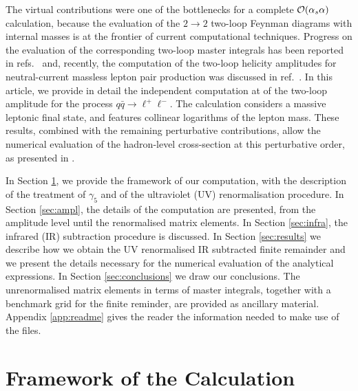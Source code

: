 \documentclass[11pt,a4paper]{article}
\begin{document}
The virtual contributions were one of the bottlenecks for a complete ${\cal O}(\alpha_{s}\alpha)$ calculation, because
the evaluation of the $2\to 2$ two-loop Feynman diagrams with internal masses is at the frontier of current computational techniques.
Progress on the evaluation of the corresponding two-loop master integrals has been reported in refs.~\cite{Bonciani:2016ypc,Heller:2019gkq,Hasan:2020vwn,Long:2021fdc}
and, recently,
the computation of the two-loop helicity amplitudes for neutral-current massless lepton pair production was discussed in ref.~\cite{Heller:2020owb}.
%
In this article, we provide in detail the independent computation at \oaas of the two-loop amplitude for the process $q\bar q\to\ell^+\ell^-$.
The calculation considers a massive leptonic final state,
and features collinear logarithms of the lepton mass.
These results, combined with the remaining perturbative contributions,
allow the numerical evaluation of the hadron-level cross-section at this perturbative order,
as presented in \cite{Bonciani:2021zzf}.


In Section \ref{sec:frame},
we provide the framework of our computation, with the description of
the treatment of $\gamma_5$ and of the ultraviolet (UV)
renormalisation procedure.
In Section \ref{sec:ampl},
the details of the computation are presented,
from the amplitude level until the renormalised matrix elements.
In Section \ref{sec:infra},
the infrared (IR) subtraction procedure is discussed.
In Section \ref{sec:results}
we describe how we obtain the UV renormalised IR subtracted finite remainder
and we present the details necessary for the numerical evaluation
of the analytical expressions.
In Section \ref{sec:conclusions}
we draw our conclusions.
The unrenormalised matrix elements in terms of master integrals,
together with a benchmark grid for the finite reminder,
are provided as ancillary material.
Appendix \ref{app:readme} gives the reader the information needed to make use of the files.


\section{Framework of the Calculation}
\label{sec:frame}
\end{document}
